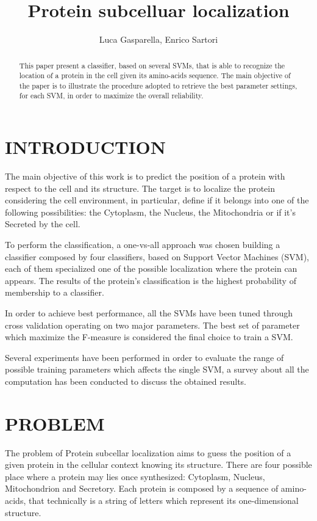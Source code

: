 \documentclass{acm_proc_article-sp-sigmod07}
\begin{document}
\title{Protein subcelluar localization}
\author{Luca Gasparella, Enrico Sartori}

\maketitle

\begin{abstract}
This paper present a classifier, based on several SVMs, that is able to 
recognize the location of a protein in the cell given its amino-acids sequence.
The main objective of the paper is to illustrate the procedure adopted to 
retrieve the best parameter settings, for each SVM, in order to maximize
the overall reliability.
\end{abstract}

\section{INTRODUCTION}
The main objective of this work is to predict the position of a protein with 
respect to the cell and its structure. The target is to localize the protein 
considering the cell environment, in particular, define if it belongs into 
one of the following possibilities: the Cytoplasm, the Nucleus, 
the Mitochondria or if it's Secreted by the cell.

To perform the classification, a one-vs-all approach was chosen building a
classifier composed by four classifiers, based on Support Vector Machines (SVM),
each of them specialized one of the possible localization where the protein can
appears. The results of the protein's classification is the highest probability 
of membership to a classifier.

In order to achieve best performance, all the SVMs have been tuned through 
cross validation operating on two major parameters. The best set of parameter
which maximize the F-measure is considered the final choice to train a
SVM.

Several experiments have been performed in order to evaluate the range of 
possible training parameters which affects the single SVM, a survey about
all the computation has been conducted to discuss the obtained results.


\section{PROBLEM}
The problem of Protein subcellar localization aims to guess the position of a 
given protein in the cellular context knowing its structure. There are four 
possible place where a protein may lies once synthesized: Cytoplasm, Nucleus, 
Mitochondrion and Secretory.  
Each protein is composed by a sequence of amino-acids, that technically is a 
string of letters which represent its one-dimensional structure. 
\end{document}
